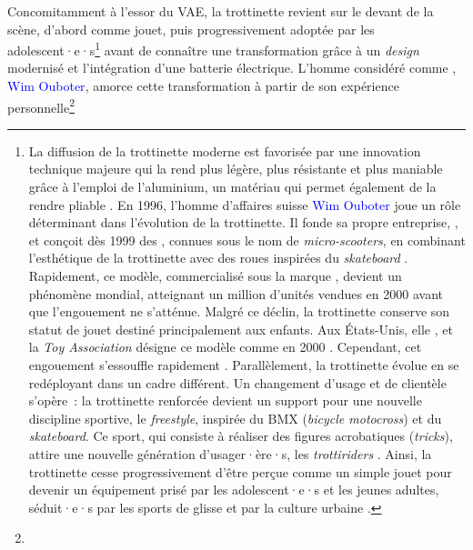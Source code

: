 \begin{refsegment}
Concomitamment à l’essor du \acrshort{VAE}, la trottinette revient sur le devant de la scène, d’abord comme jouet, puis progressivement adoptée par les adolescent·e·s\footnote{
    La diffusion de la trottinette moderne est favorisée par une innovation technique majeure qui la rend plus légère, plus résistante et plus maniable grâce à l’emploi de l’aluminium, un matériau qui permet également de la rendre pliable \textcolor{blue}{\autocite{arte_histoire_2014}}. En 1996, l’homme d’affaires suisse \textcolor{blue}{Wim Ouboter} joue un rôle déterminant dans l’évolution de la trottinette. Il fonde sa propre entreprise, , et conçoit dès 1999 des , connues sous le nom de \textsl{micro-scooters}, en combinant l’esthétique de la trottinette avec des roues inspirées du \textsl{skateboard} \textcolor{blue}{\autocite{les_numeriques_futur_2015}}. Rapidement, ce modèle, commercialisé sous la marque , devient un phénomène mondial, atteignant un million d’unités vendues en 2000 avant que l’engouement ne s’atténue. Malgré ce déclin, la trottinette conserve son statut de jouet destiné principalement aux enfants. Aux États-Unis, elle , et la \textsl{Toy Association} désigne ce modèle comme  en 2000 \textcolor{blue}{\autocite{bloomberg_citylab_man_2018}}. Cependant, cet engouement s’essouffle rapidement \textcolor{blue}{\autocite[25]{university_of_st_gallen_micro_2011}}. Parallèlement, la trottinette évolue en se redéployant dans un cadre différent. Un changement d’usage et de clientèle s’opère~: la trottinette renforcée devient un support pour une nouvelle discipline sportive, le \textsl{freestyle}, inspirée du BMX (\textsl{bicycle motocross}) et du \textsl{skateboard}. Ce sport, qui consiste à réaliser des figures acrobatiques (\textsl{tricks}), attire une nouvelle génération d’usager·ère·s, les \textsl{trottiriders} \textcolor{blue}{\autocite{micro-mobility_innovations_2018}}. Ainsi, la trottinette cesse progressivement d’être perçue comme un simple jouet pour devenir un équipement prisé par les adolescent·e·s et les jeunes adultes, séduit·e·s par les sports de glisse et par la culture urbaine \textcolor{blue}{\autocite{ma_trott_histoire_2020}}.
} avant de connaître une transformation grâce à un \textsl{design} modernisé et l’intégration d’une batterie électrique. L’homme considéré comme , \textcolor{blue}{Wim Ouboter}, amorce cette transformation à partir de son expérience personnelle\footnote{
}
\end{refsegment}
